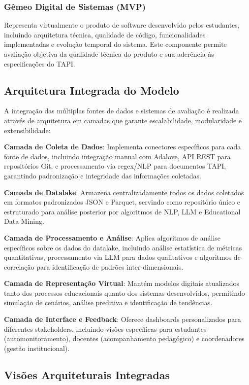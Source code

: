 \documentclass[12pt,a4paper]{article}
\begin{document}
\subsubsection{Gêmeo Digital de Sistemas (MVP)}

Representa virtualmente o produto de software desenvolvido pelos estudantes, incluindo arquitetura técnica, qualidade de código, funcionalidades implementadas e evolução temporal do sistema. Este componente permite avaliação objetiva da qualidade técnica do produto e sua aderência às especificações do TAPI.

\subsection{Arquitetura Integrada do Modelo}

A integração das múltiplas fontes de dados e sistemas de avaliação é realizada através de arquitetura em camadas que garante escalabilidade, modularidade e extensibilidade:

\textbf{Camada de Coleta de Dados}: Implementa conectores específicos para cada fonte de dados, incluindo integração manual com Adalove, API REST para repositórios Git, e processamento via regex/NLP para documentos TAPI, garantindo padronização e integridade das informações coletadas.

\textbf{Camada de Datalake}: Armazena centralizadamente todos os dados coletados em formatos padronizados JSON e Parquet, servindo como repositório único e estruturado para análise posterior por algoritmos de NLP, LLM e Educational Data Mining.

\textbf{Camada de Processamento e Análise}: Aplica algoritmos de análise específicos sobre os dados do datalake, incluindo análise estatística de métricas quantitativas, processamento via LLM para dados qualitativos e algoritmos de correlação para identificação de padrões inter-dimensionais.

\textbf{Camada de Representação Virtual}: Mantém modelos digitais atualizados tanto dos processos educacionais quanto dos sistemas desenvolvidos, permitindo simulação de cenários, análise preditiva e identificação de tendências.

\textbf{Camada de Interface e Feedback}: Oferece dashboards personalizados para diferentes stakeholders, incluindo visões específicas para estudantes (automonitoramento), docentes (acompanhamento pedagógico) e coordenadores (gestão institucional).

\subsection{Visões Arquiteturais Integradas}
\end{document}

